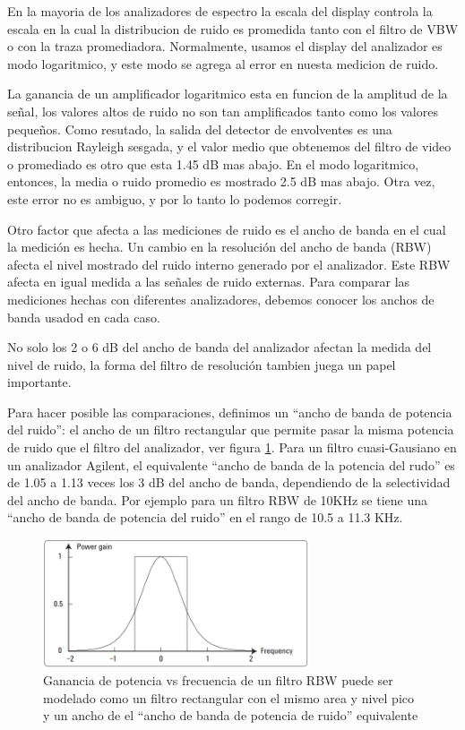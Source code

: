 \documentclass[a4paper,12pt,twoside]{article}
\newcommand{\quotes}[1]{``#1''}
\begin{document}
En la mayoria de los analizadores de espectro la escala del display controla la escala en la cual la distribucion de ruido es promedida tanto con el filtro de VBW o con la traza promediadora. Normalmente, usamos el display del analizador es modo logaritmico, y este modo se agrega al error en nuesta medicion de ruido.\newline

La ganancia de un amplificador logaritmico esta en funcion de la amplitud de la señal, los valores altos de ruido no son tan amplificados tanto como los valores pequeños. Como resutado, la salida del detector de envolventes es una distribucion Rayleigh sesgada, y el valor medio que obtenemos del filtro de video o promediado es otro que esta 1.45 dB mas abajo. En el modo logaritmico, entonces, la media o ruido promedio es mostrado 2.5 dB mas abajo.
Otra vez, este error no es ambiguo, y por lo tanto lo podemos corregir.\newline

Otro factor que afecta a las mediciones de ruido es el ancho de banda en el cual la medición es hecha. Un cambio en la resolución del ancho de banda (RBW) afecta el nivel mostrado del ruido interno generado por el analizador. Este RBW afecta en igual medida a las señales de ruido externas. Para comparar las mediciones hechas con diferentes analizadores, debemos conocer los anchos de banda usadod en cada caso.\newline

No solo los 2 o 6 dB del ancho de banda del analizador afectan la medida del nivel de ruido, la forma del filtro  de resolución tambien juega un papel importante.\newline

Para hacer posible las comparaciones, definimos un \quotes{ancho de banda de potencia del ruido}: el ancho de un filtro rectangular que permite pasar la misma potencia de ruido que el filtro del  analizador, ver figura \ref{modelo}. Para un filtro cuasi-Gausiano en un analizador Agilent, el equivalente \quotes{ancho de banda de la potencia del rudo} es de 1.05 a 1.13 veces los 3 dB del ancho de banda, dependiendo de la selectividad del ancho de banda. Por ejemplo para un filtro RBW de 10KHz se tiene una \quotes{ancho de banda de potencia del ruido} en el rango de 10.5 a 11.3 KHz.\newline

\begin{figure}[H]
    \includegraphics[width=0.7\textwidth]{../img/modelado.png}
        \caption{Ganancia de potencia vs frecuencia de un filtro RBW puede ser modelado como un filtro rectangular con el mismo area y nivel pico y un ancho de el \quotes{ancho de banda de potencia de ruido} equivalente}
        \label{modelo}
\end{figure}
\end{document}
